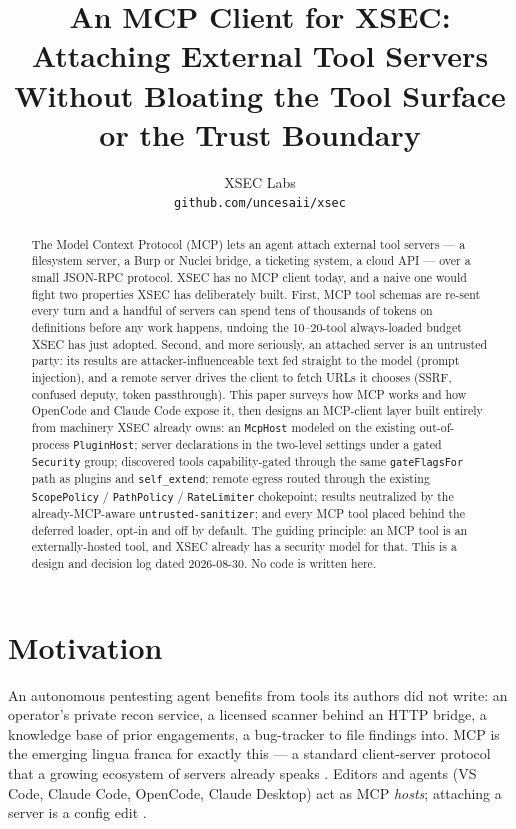 \documentclass[11pt]{article}
\title{An MCP Client for XSEC: Attaching External Tool Servers\\
Without Bloating the Tool Surface or the Trust Boundary}
\author{
  XSEC Labs \\
  \texttt{github.com/uncesaii/xsec}
}
\date{}
\begin{document}
\maketitle

\begin{abstract}
The Model Context Protocol (MCP) lets an agent attach external tool servers ---
a filesystem server, a Burp or Nuclei bridge, a ticketing system, a cloud API
--- over a small JSON-RPC protocol. XSEC has no MCP client today, and a naive one
would fight two properties XSEC has deliberately built. First, MCP tool schemas
are re-sent every turn and a handful of servers can spend tens of thousands of
tokens on definitions before any work happens, undoing the 10--20-tool
always-loaded budget XSEC has just adopted. Second, and more seriously, an
attached server is an untrusted party: its results are attacker-influenceable
text fed straight to the model (prompt injection), and a remote server drives the
client to fetch URLs it chooses (SSRF, confused deputy, token passthrough). This
paper surveys how MCP works and how OpenCode and Claude Code expose it, then
designs an MCP-client layer built entirely from machinery XSEC already owns: an
\texttt{McpHost} modeled on the existing out-of-process \texttt{PluginHost};
server declarations in the two-level settings under a gated \texttt{Security}
group; discovered tools capability-gated through the same
\texttt{gateFlagsFor} path as plugins and \texttt{self\_extend}; remote egress
routed through the existing \texttt{ScopePolicy} / \texttt{PathPolicy} /
\texttt{RateLimiter} chokepoint; results neutralized by the already-MCP-aware
\texttt{untrusted-sanitizer}; and every MCP tool placed behind the deferred
loader, opt-in and off by default. The guiding principle: an MCP tool is an
externally-hosted tool, and XSEC already has a security model for that. This is a
design and decision log dated 2026-08-30. No code is written here.
\end{abstract}

\section{Motivation}

An autonomous pentesting agent benefits from tools its authors did not write:
an operator's private recon service, a licensed scanner behind an HTTP bridge,
a knowledge base of prior engagements, a bug-tracker to file findings into. MCP
is the emerging lingua franca for exactly this --- a standard client-server
protocol that a growing ecosystem of servers already speaks
\cite{mcp-arch}. Editors and agents (VS Code, Claude Code, OpenCode, Claude
Desktop) act as MCP \emph{hosts}; attaching a server is a config edit
\cite{mcp-arch,claudecode-mcp,opencode-mcp}.
\end{document}
